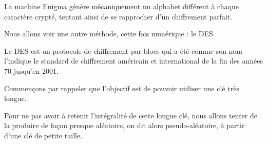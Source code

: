 % 
% 
% 
% 
% 
% 
% 
% 
% 
% 
% 
% 
% 
% 
% 
% 
% 
% 
% 
% 
% 


\diapo


La machine Enigma génère mécaniquement un alphabet différent à chaque caractère crypté, 
tentant ainsi de se rapprocher d'un chiffrement parfait.

\change

Nous allons voir une autre méthode, cette fois numérique : le DES. 

Le DES est un protocole de chiffrement par blocs qui a été comme son nom l'indique le standard de chiffrement américain et international de la fin des années 70 jusqu'en 2001.

\change

Commençons par rappeler que l'objectif est de pouvoir utiliser une clé très longue.

\change

Pour ne pas avoir à retenir l'intégralité de cette longue clé, nous allons tenter de la produire de façon presque aléatoire, on dit alors pseudo-aléatoire, à partir d'une clé de petite taille.


